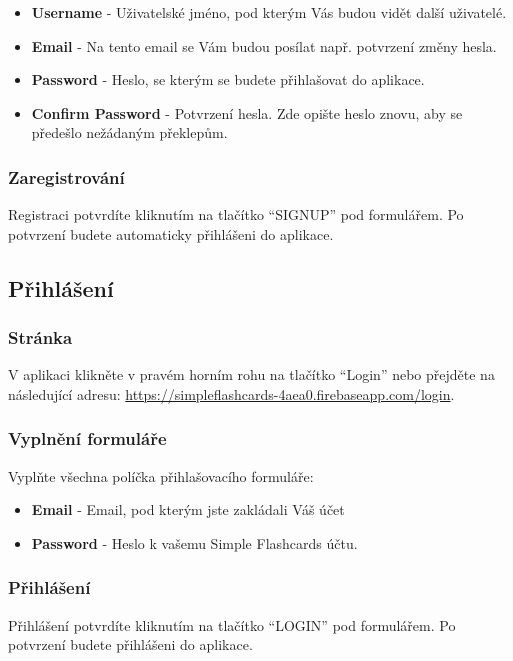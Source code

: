 \documentclass[a4paper,12pt]{article}
\begin{document}
\begin{itemize}
	\item \textbf{Username} - Uživatelské jméno, pod kterým Vás budou vidět další uživatelé. 
	\item \textbf{Email} - Na tento email se Vám budou posílat např. potvrzení změny hesla.
	\item \textbf{Password} - Heslo, se kterým se budete přihlašovat do aplikace.
	\item \textbf{Confirm Password} - Potvrzení hesla. Zde opište heslo znovu, aby se předešlo nežádaným překlepům.
\end{itemize}

\subsubsection*{Zaregistrování}
Registraci potvrdíte kliknutím na tlačítko \enquote{SIGNUP} pod formulářem. Po potvrzení budete automaticky přihlášeni do aplikace.

\subsection{Přihlášení}
\subsubsection*{Stránka}
V aplikaci klikněte v pravém horním rohu na tlačítko \enquote{Login} nebo přejděte na následující adresu:  \href{https://simpleflashcards-4aea0.firebaseapp.com/login}{https://simpleflashcards-4aea0.firebaseapp.com/login}.

\subsubsection*{Vyplnění formuláře}
Vyplňte všechna políčka přihlašovacího formuláře:

\begin{itemize}
	\item \textbf{Email } - Email, pod kterým jste zakládali Váš účet
	\item \textbf{Password } - Heslo k vašemu Simple Flashcards účtu.
\end{itemize}

\subsubsection*{Přihlášení}
Přihlášení potvrdíte kliknutím na tlačítko \enquote{LOGIN} pod formulářem. Po potvrzení budete přihlášeni do aplikace.
\end{document}
